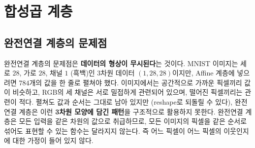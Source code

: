 \documentclass[11pt,a4paper]{article}
\begin{document}
\section{합성곱 계층}\label{sec:conv}

\subsection{완전연결 계층의 문제점}\label{sec:fcproblem}

완전연결 계층의 문제점은 \textbf{데이터의 형상이 무시된다}는 것이다.
MNIST 이미지는 세로 $28$, 가로 $28$, 채널 $1$ (흑백)인 3차원 데이터 $(1, 28, 28)$이지만,
Affine 계층에 넣으려면 $784$개의 값을 한 줄로 펼쳐야 했다.
이미지에서는 공간적으로 가까운 픽셀끼리 값이 비슷하고, RGB의 세 채널은 서로 밀접하게 관련되어 있으며,
떨어진 픽셀끼리는 관련이 적다. 펼쳐도 값과 순서는 그대로 남아 있지만 (reshape로 되돌릴 수 있다), 완전연결 계층은 이런 \textbf{3차원 모양에 담긴 패턴}을 구조적으로 활용하지 못한다.
완전연결 계층은 모든 입력을 같은 차원의 값으로 취급하므로, 모든 이미지의 픽셀을 같은 순서로 섞어도 표현할 수 있는 함수는 달라지지 않는다.
즉 어느 픽셀이 어느 픽셀의 이웃인지에 대한 가정이 들어 있지 않다.
\end{document}
